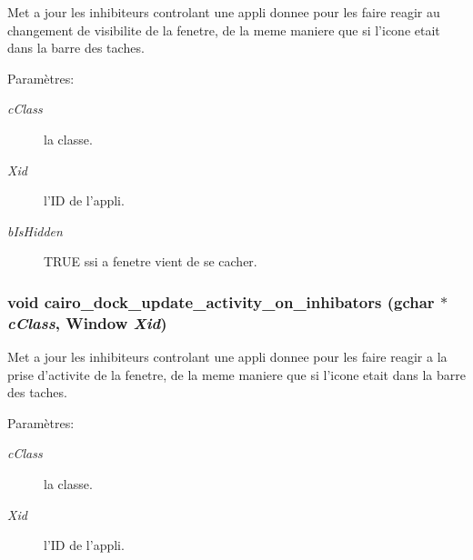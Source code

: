 Met a jour les inhibiteurs controlant une appli donnee pour les faire reagir au changement de visibilite de la fenetre, de la meme maniere que si l'icone etait dans la barre des taches. \begin{Desc}
\item[Paramètres:]
\begin{description}
\item[{\em cClass}]la classe. \item[{\em Xid}]l'ID de l'appli. \item[{\em bIsHidden}]TRUE ssi a fenetre vient de se cacher. \end{description}
\end{Desc}
\subsubsection{\setlength{\rightskip}{0pt plus 5cm}void cairo\_\-dock\_\-update\_\-activity\_\-on\_\-inhibators (gchar $\ast$ {\em cClass}, Window {\em Xid})}\label{cairo-dock-class-manager_8h_3e1527f25e9105b53aaa5b25d39f7874}


Met a jour les inhibiteurs controlant une appli donnee pour les faire reagir a la prise d'activite de la fenetre, de la meme maniere que si l'icone etait dans la barre des taches. \begin{Desc}
\item[Paramètres:]
\begin{description}
\item[{\em cClass}]la classe. \item[{\em Xid}]l'ID de l'appli. \end{description}
\end{Desc}
